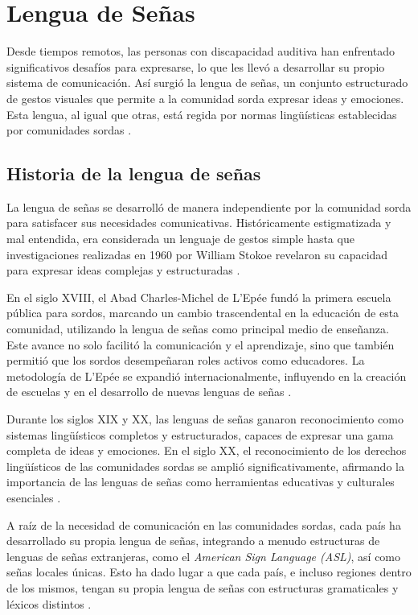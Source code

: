 \section{Lengua de Señas}
Desde tiempos remotos, las personas con discapacidad auditiva han enfrentado significativos desafíos para expresarse, lo que les llevó a desarrollar su propio sistema de comunicación. Así surgió la lengua de señas, un conjunto estructurado de gestos visuales que permite a la comunidad sorda expresar ideas y emociones. Esta lengua, al igual que otras, está regida por normas lingüísticas establecidas por comunidades sordas \cite{MarzoPena2022}.

\subsection{Historia de la lengua de señas}
La lengua de señas se desarrolló de manera independiente por la comunidad sorda para satisfacer sus necesidades comunicativas. Históricamente estigmatizada y mal entendida, era considerada un lenguaje de gestos simple hasta que investigaciones realizadas en 1960 por William Stokoe revelaron su capacidad para expresar ideas complejas y estructuradas \cite{RodriguezVelasquezSF}.

En el siglo XVIII, el Abad Charles-Michel de L’Epée fundó la primera escuela pública para sordos, marcando un cambio trascendental en la educación de esta comunidad, utilizando la lengua de señas como principal medio de enseñanza. Este avance no solo facilitó la comunicación y el aprendizaje, sino que también permitió que los sordos desempeñaran roles activos como educadores. La metodología de L’Epée se expandió internacionalmente, influyendo en la creación de escuelas y en el desarrollo de nuevas lenguas de señas \cite{RodriguezVelasquezSF}.

Durante los siglos XIX y XX, las lenguas de señas ganaron reconocimiento como sistemas lingüísticos completos y estructurados, capaces de expresar una gama completa de ideas y emociones. En el siglo XX, el reconocimiento de los derechos lingüísticos de las comunidades sordas se amplió significativamente, afirmando la importancia de las lenguas de señas como herramientas educativas y culturales esenciales \cite{RodriguezVelasquezSF}.

A raíz de la necesidad de comunicación en las comunidades sordas, cada país ha desarrollado su propia lengua de señas, integrando a menudo estructuras de lenguas de señas extranjeras, como el \textit{American Sign Language (ASL)}, así como señas locales únicas. Esto ha dado lugar a que cada país, e incluso regiones dentro de los mismos, tengan su propia lengua de señas con estructuras gramaticales y léxicos distintos \cite{RuizVilla2022}.

